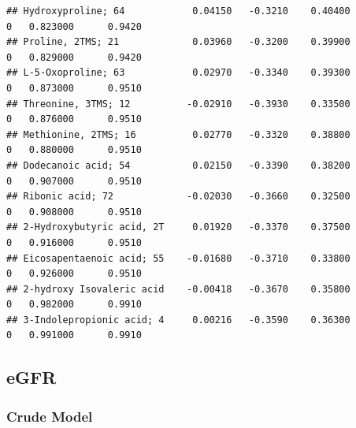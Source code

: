 \documentclass[]{article}
\begin{document}
\begin{verbatim}
## Hydroxyproline; 64            0.04150   -0.3210    0.40400         0   0.823000      0.9420
## Proline, 2TMS; 21             0.03960   -0.3200    0.39900         0   0.829000      0.9420
## L-5-Oxoproline; 63            0.02970   -0.3340    0.39300         0   0.873000      0.9510
## Threonine, 3TMS; 12          -0.02910   -0.3930    0.33500         0   0.876000      0.9510
## Methionine, 2TMS; 16          0.02770   -0.3320    0.38800         0   0.880000      0.9510
## Dodecanoic acid; 54           0.02150   -0.3390    0.38200         0   0.907000      0.9510
## Ribonic acid; 72             -0.02030   -0.3660    0.32500         0   0.908000      0.9510
## 2-Hydroxybutyric acid, 2T     0.01920   -0.3370    0.37500         0   0.916000      0.9510
## Eicosapentaenoic acid; 55    -0.01680   -0.3710    0.33800         0   0.926000      0.9510
## 2-hydroxy Isovaleric acid    -0.00418   -0.3670    0.35800         0   0.982000      0.9910
## 3-Indolepropionic acid; 4     0.00216   -0.3590    0.36300         0   0.991000      0.9910
\end{verbatim}

\newpage

\hypertarget{egfr}{%
\subsection{eGFR}\label{egfr}}

\hypertarget{crude-model-1}{%
\subsubsection{Crude Model}\label{crude-model-1}}
\end{document}

